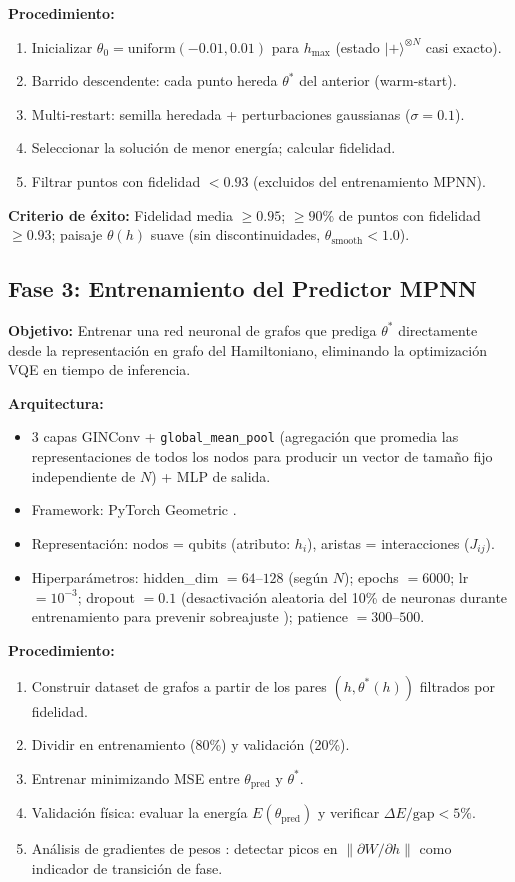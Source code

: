 \documentclass[11pt,a4paper,spanish]{book}
\begin{document}
\textbf{Procedimiento:}
\begin{enumerate}
    \item Inicializar $\theta_0 = \text{uniform}(-0.01, 0.01)$ para $h_{\max}$ (estado $|+\rangle^{\otimes N}$ casi exacto).
    \item Barrido descendente: cada punto hereda $\theta^*$ del anterior (warm-start).
    \item Multi-restart: semilla heredada + perturbaciones gaussianas ($\sigma = 0.1$).
    \item Seleccionar la solución de menor energía; calcular fidelidad.
    \item Filtrar puntos con fidelidad $< 0.93$ (excluidos del entrenamiento MPNN).
\end{enumerate}

\textbf{Criterio de éxito:} Fidelidad media $\geq 0.95$; $\geq 90\%$ de puntos con fidelidad $\geq 0.93$; paisaje $\theta(h)$ suave (sin discontinuidades, $\theta_{\text{smooth}} < 1.0$).

\subsection{Fase 3: Entrenamiento del Predictor MPNN}

\textbf{Objetivo:} Entrenar una red neuronal de grafos que prediga $\theta^*$ directamente desde la representación en grafo del Hamiltoniano, eliminando la optimización VQE en tiempo de inferencia.

\textbf{Arquitectura:}
\begin{itemize}
    \item 3 capas GINConv \citep{xu2019} + \texttt{global\_mean\_pool} (agregación que promedia las representaciones de todos los nodos para producir un vector de tamaño fijo independiente de $N$) + MLP de salida.
    \item Framework: PyTorch Geometric \citep{fey2019}.
    \item Representación: nodos = qubits (atributo: $h_i$), aristas = interacciones ($J_{ij}$).
    \item Hiperparámetros: hidden\_dim $= 64$--$128$ (según $N$); epochs $= 6000$; lr $= 10^{-3}$; dropout $= 0.1$ (desactivación aleatoria del 10\% de neuronas durante entrenamiento para prevenir sobreajuste \citep{gal2016}); patience $= 300$--$500$.
\end{itemize}

\textbf{Procedimiento:}
\begin{enumerate}
    \item Construir dataset de grafos a partir de los pares $(h, \theta^*(h))$ filtrados por fidelidad.
    \item Dividir en entrenamiento (80\%) y validación (20\%).
    \item Entrenar minimizando MSE entre $\theta_{\text{pred}}$ y $\theta^*$.
    \item Validación física: evaluar la energía $E(\theta_{\text{pred}})$ y verificar $\Delta E/\text{gap} < 5\%$.
    \item Análisis de gradientes de pesos \citep{hernandes2025}: detectar picos en $\|\partial W / \partial h\|$ como indicador de transición de fase.
\end{enumerate}
\end{document}
